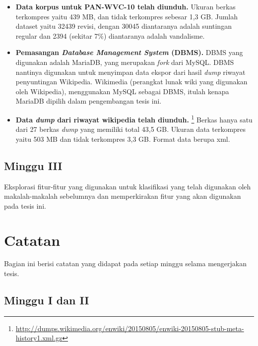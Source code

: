 \documentclass[12pt,a4paper,titlepage]{article}
\begin{document}
\begin{itemize}
	\item \textbf{Data korpus untuk PAN-WVC-10 telah diunduh.}
Ukuran berkas terkompres yaitu 439 MB, dan tidak terkompres sebesar 1,3 GB.
Jumlah dataset yaitu 32439 revisi, dengan 30045 diantaranya adalah suntingan regular dan 2394 (sekitar 7\%) diantaranya adalah vandalisme.

	\item \textbf{Pemasangan \textit{Database Management System} (DBMS).}
DBMS yang digunakan adalah MariaDB, yang merupakan \textit{fork} dari MySQL.
DBMS nantinya digunakan untuk menyimpan data ekspor dari hasil \textit{dump} riwayat penyuntingan Wikipedia.
Wikimedia (perangkat lunak wiki yang digunakan oleh Wikipedia), menggunakan MySQL sebagai DBMS, itulah kenapa MariaDB dipilih dalam pengembangan tesis ini.

	\item \textbf{Data \textit{dump} dari riwayat wikipedia telah diunduh.} \footnote{\RaggedRight\url{http://dumps.wikimedia.org/enwiki/20150805/enwiki-20150805-stub-meta-history1.xml.gz}}
Berkas hanya satu dari 27 berkas \textit{dump} yang memiliki total 43,5 GB.
Ukuran data terkompres yaitu 503 MB dan tidak terkompres 3,3 GB.
Format data berupa xml.
\end{itemize}

\subsection{Minggu III}

Eksplorasi fitur-fitur yang digunakan untuk klasifikasi yang telah digunakan oleh makalah-makalah sebelumnya dan memperkirakan fitur yang akan digunakan pada tesis ini.

\newpage
\section{Catatan} \label{sec:catatan}

Bagian ini berisi catatan yang didapat pada setiap minggu selama mengerjakan tesis.

\subsection{Minggu I dan II}
\end{document}
